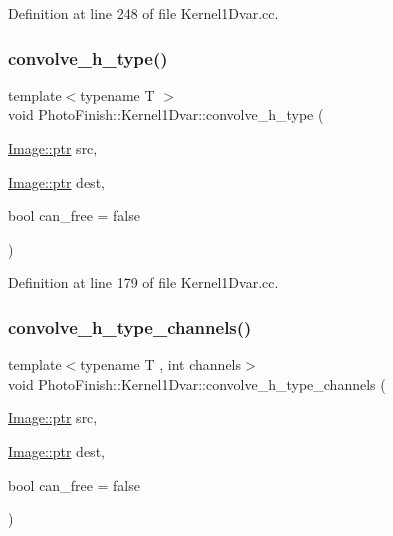 Definition at line 248 of file Kernel1\+Dvar.\+cc.

\mbox{\label{class_photo_finish_1_1_kernel1_dvar_a2ab889fb58b80f3cbb0dd0822c6034e5}} 
\subsubsection{\texorpdfstring{convolve\+\_\+h\+\_\+type()}{convolve\_h\_type()}}
{\footnotesize\ttfamily template$<$typename T $>$ \\
void Photo\+Finish\+::\+Kernel1\+Dvar\+::convolve\+\_\+h\+\_\+type (\begin{DoxyParamCaption}\item[{\hyperlink{class_photo_finish_1_1_image_ab336203305ed3a1397d7245063353b5a}{Image\+::ptr}}]{src,  }\item[{\hyperlink{class_photo_finish_1_1_image_ab336203305ed3a1397d7245063353b5a}{Image\+::ptr}}]{dest,  }\item[{bool}]{can\+\_\+free = {\ttfamily false} }\end{DoxyParamCaption})\hspace{0.3cm}{\ttfamily [protected]}}



Definition at line 179 of file Kernel1\+Dvar.\+cc.

\mbox{\label{class_photo_finish_1_1_kernel1_dvar_a1cad3fb4a39faa44c4b66ea325e648a6}} 
\subsubsection{\texorpdfstring{convolve\+\_\+h\+\_\+type\+\_\+channels()}{convolve\_h\_type\_channels()}}
{\footnotesize\ttfamily template$<$typename T , int channels$>$ \\
void Photo\+Finish\+::\+Kernel1\+Dvar\+::convolve\+\_\+h\+\_\+type\+\_\+channels (\begin{DoxyParamCaption}\item[{\hyperlink{class_photo_finish_1_1_image_ab336203305ed3a1397d7245063353b5a}{Image\+::ptr}}]{src,  }\item[{\hyperlink{class_photo_finish_1_1_image_ab336203305ed3a1397d7245063353b5a}{Image\+::ptr}}]{dest,  }\item[{bool}]{can\+\_\+free = {\ttfamily false} }\end{DoxyParamCaption})\hspace{0.3cm}{\ttfamily [protected]}}



